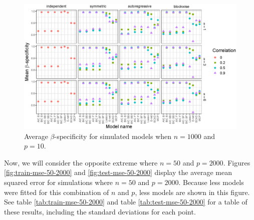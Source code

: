 \documentclass{article}
\begin{document}
\begin{figure}[h!]
	\centering
	\includegraphics[width = \textwidth]{images/facet-specificity/facet_specificity_1000_10.eps}
	\captionsetup{width = 0.8\textwidth}
	\caption{Average $\beta$-specificity for simulated models when $n = 1000$ and $p = 10$.}
	\label{fig:specificity-1000-10}
\end{figure}

Now, we will consider the opposite extreme where $n = 50$ and $p = 2000$. Figures \ref{fig:train-mse-50-2000} and \ref{fig:test-mse-50-2000} display the average mean squared error for simulations where $n = 50$ and $p = 2000$. Because less models were fitted for this combination of $n$ and $p$, less models are shown in this figure. See table \ref{tab:train-mse-50-2000} and table \ref{tab:test-mse-50-2000} for a table of these results, including the standard deviations for each point.
\end{document}
